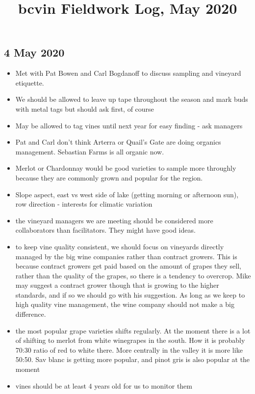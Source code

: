 \documentclass[11pt,letter]{article}
\newenvironment{smitemize}{
\begin{itemize}
  \setlength{\itemsep}{0pt}
  \setlength{\parskip}{0.8pt}
  \setlength{\parsep}{0pt}}
{\end{itemize}
}
\begin{document}

\renewcommand{\refname}{\CHead{}}

\title{bcvin Fieldwork Log, May 2020}
\author{}
\maketitle
\tableofcontents

\subsection{4 May 2020}
\begin{smitemize}
\item Met with Pat Bowen and Carl Bogdanoff to discuss sampling and vineyard etiquette.
\item We should be allowed to leave up tape throughout the season and mark buds with metal tags but should ask first, of course
\item May be allowed to tag vines until next year for easy finding - ask managers
\item Pat and Carl don't think Arterra or Quail's Gate are doing organics management. Sebastian Farms is all organic now.
\item Merlot or Chardonnay would be good varieties to sample more throughly because they are commonly grown and popular for the region.
\item Slope aspect, east vs west side of lake (getting morning or afternoon sun), row direction - interests for climatic variation
\item the vineyard managers we are meeting should be considered more collaborators than facilitators. They might have good ideas.
\item to keep vine quality consistent, we should focus on vineyards directly managed by the big wine companies rather than contract growers. This is because contract growers get paid based on the amount of grapes they sell, rather than the quality of the grapes, so there is a tendency to overcrop. Mike may suggest a contract grower though that is growing to the higher standards, and if so we should go with his suggestion. As long as we keep to high quality vine management, the wine company should not make a big difference.
\item the most popular grape varieties shifts regularly. At the moment there is a lot of shifting to merlot from white winegrapes in the south. How it is probably 70:30 ratio of red to white there. More centrally in the valley it is more like 50:50. Sav blanc is getting more popular, and pinot gris is also popular at the moment
\item vines should be at least 4 years old for us to monitor them

\end{smitemize}
\end{document}
